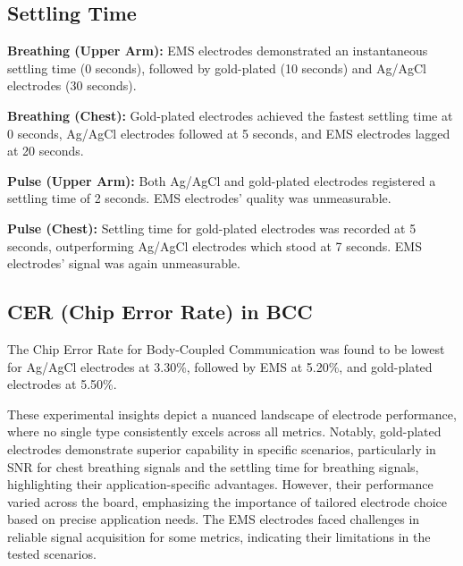 \documentclass[conference]{IEEEtran}
\begin{document}
\subsection{Settling Time}

 \textbf{Breathing (Upper Arm):} EMS electrodes demonstrated an instantaneous settling time (0 seconds), followed by gold-plated (10 seconds) and Ag/AgCl electrodes (30 seconds).
 
    \textbf{Breathing (Chest):} Gold-plated electrodes achieved the fastest settling time at 0 seconds, Ag/AgCl electrodes followed at 5 seconds, and EMS electrodes lagged at 20 seconds.
 
    \textbf{Pulse (Upper Arm):} Both Ag/AgCl and gold-plated electrodes registered a settling time of 2 seconds. EMS electrodes' quality was unmeasurable.

 \textbf{Pulse (Chest):} Settling time for gold-plated electrodes was recorded at 5 seconds, outperforming Ag/AgCl electrodes which stood at 7 seconds. EMS electrodes' signal was again unmeasurable.


\subsection{CER (Chip Error Rate) in BCC}

The Chip Error Rate for Body-Coupled Communication was found to be lowest for Ag/AgCl electrodes at 3.30\%, followed by EMS at 5.20\%, and gold-plated electrodes at 5.50\%.

These experimental insights depict a nuanced landscape of electrode performance, where no single type consistently excels across all metrics. Notably, gold-plated electrodes demonstrate superior capability in specific scenarios, particularly in SNR for chest breathing signals and the settling time for breathing signals, highlighting their application-specific advantages. However, their performance varied across the board, emphasizing the importance of tailored electrode choice based on precise application needs. The EMS electrodes faced challenges in reliable signal acquisition for some metrics, indicating their limitations in the tested scenarios.
\end{document}
